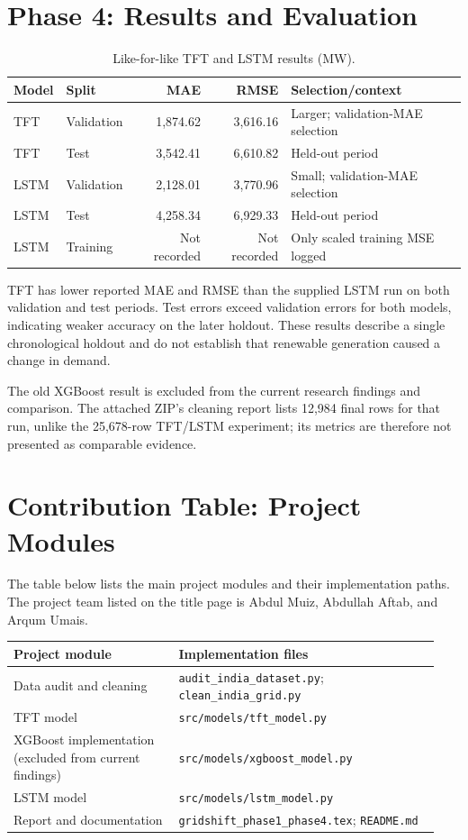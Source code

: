 \documentclass[11pt,a4paper]{article}
\begin{document}
\section{Phase 4: Results and Evaluation}
\begin{table}[H]\centering\caption{Like-for-like TFT and LSTM results (MW).}\begin{tabular}{llrrl}\toprule Model & Split & MAE & RMSE & Selection/context \\\midrule TFT & Validation & 1,874.62 & 3,616.16 & Larger; validation-MAE selection \\
TFT & Test & 3,542.41 & 6,610.82 & Held-out period \\
LSTM & Validation & 2,128.01 & 3,770.96 & Small; validation-MAE selection \\
LSTM & Test & 4,258.34 & 6,929.33 & Held-out period \\
LSTM & Training & Not recorded & Not recorded & Only scaled training MSE logged \\\bottomrule\end{tabular}\end{table}

TFT has lower reported MAE and RMSE than the supplied LSTM run on both validation and test periods. Test errors exceed validation errors for both models, indicating weaker accuracy on the later holdout. These results describe a single chronological holdout and do not establish that renewable generation caused a change in demand.

The old XGBoost result is excluded from the current research findings and comparison. The attached ZIP's cleaning report lists 12,984 final rows for that run, unlike the 25,678-row TFT/LSTM experiment; its metrics are therefore not presented as comparable evidence.
\section{Contribution Table: Project Modules}
The table below lists the main project modules and their implementation paths. The project team listed on the title page is Abdul Muiz, Abdullah Aftab, and Arqum Umais.
\begin{longtable}{p{0.36\linewidth}p{0.58\linewidth}}\toprule Project module & Implementation files \\\midrule
Data audit and cleaning & \texttt{audit\_india\_dataset.py}; \texttt{clean\_india\_grid.py} \\
TFT model & \texttt{src/models/tft\_model.py} \\
XGBoost implementation (excluded from current findings) & \texttt{src/models/xgboost\_model.py} \\
LSTM model & \texttt{src/models/lstm\_model.py} \\
Report and documentation & \texttt{gridshift\_phase1\_phase4.tex}; \texttt{README.md} \\\bottomrule\end{longtable}
\end{document}
